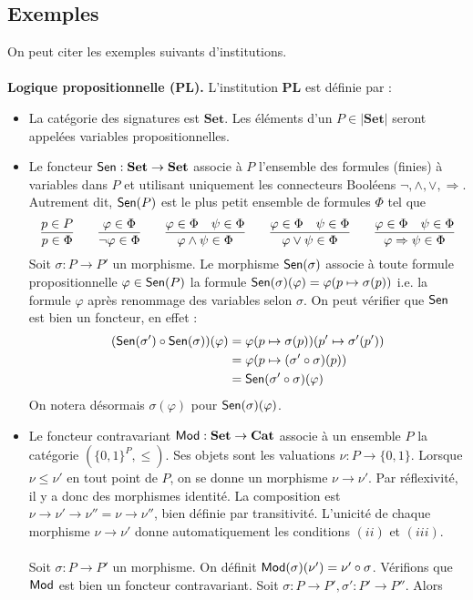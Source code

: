 \documentclass[11pt,a4paper]{article}
\newcommand{\ph}{\varphi}
\newcommand{\itemz}{\item[$\triangleright$]}
\newcommand{\gr}{\textbf}
\newcommand{\info}[1]{\text{{\fontfamily{lmss}\selectfont #1}}}
\newcommand{\Mod}{\info{Mod}}
\newcommand{\Sen}{\info{Sen}}
\begin{document}
\subsection{Exemples}
On peut citer les exemples suivants d'institutions.\\\\
\gr{Logique propositionnelle ($\gr{PL}$).} L'institution $\gr{PL}$ est définie par :
\begin{itemize}
\itemz La catégorie des signatures est $\gr{Set}$. Les éléments d'un $P \in |\gr{Set}|$ seront appelées variables propositionnelles.
\itemz Le foncteur $\Sen : \gr{Set} \to \gr{Set}$ associe à $P$ l'ensemble des formules (finies) à variables dans $P$ et utilisant uniquement les connecteurs Booléens $\neg, \wedge, \vee, \Rightarrow$. Autrement dit, $\Sen(P)$ est le plus petit ensemble de formules $\Phi$ tel que
$$
\infer{p \in \Phi}{p \in P}
\qquad
\infer{\neg \ph \in \Phi}{\ph \in \Phi}
\qquad
\infer{\ph \wedge \psi \in \Phi}{\ph \in \Phi & \psi \in \Phi }
\qquad
\infer{\ph \vee \psi \in \Phi}{\ph \in \Phi & \psi \in \Phi }
\qquad
\infer{\ph \Rightarrow \psi \in \Phi}{\ph \in \Phi & \psi \in \Phi }
$$
Soit $\sigma : P \to P'$ un morphisme. Le morphisme $\Sen(\sigma)$ associe à toute formule propositionnelle $\ph \in \Sen(P)$ la formule $\Sen(\sigma)(\ph) = \ph(p \mapsto \sigma(p))$ i.e. la formule $\ph$ après renommage des variables selon $\sigma$. On peut vérifier que $\Sen$ est bien un foncteur, en effet :
\begin{align*}
 (\Sen(\sigma') \circ \Sen(\sigma)) (\ph) & = \ph(p \mapsto \sigma(p))(p' \mapsto \sigma'(p')) \\ & = \ph(p \mapsto (\sigma' \circ \sigma)(p)) \\ & = \Sen(\sigma' \circ \sigma)(\ph) 
 \end{align*}
On notera désormais $\sigma(\ph)$ pour $\Sen(\sigma)(\ph)$.
\itemz Le foncteur contravariant $\Mod : \gr{Set} \to \gr{Cat}$ associe à un ensemble $P$ la catégorie $(\{0,1\}^P, \leq)$. Ses objets sont les valuations $\nu : P \to \{0,1\}$. Lorsque $\nu \leq \nu'$ en tout point de $P$, on se donne un morphisme $\nu \to \nu'$. Par réflexivité, il y a donc des morphismes identité. La composition est $\nu \to \nu' \to \nu'' = \nu \to \nu''$, bien définie par transitivité. L'unicité de chaque morphisme $\nu \to \nu'$ donne automatiquement les conditions $(ii)$ et $(iii)$.\\\\
Soit $\sigma : P \to P'$ un morphisme. On définit $\Mod(\sigma)(\nu') = \nu' \circ \sigma$. Vérifions que $\Mod$ est bien un foncteur contravariant. Soit $\sigma : P \to P', \sigma' : P' \to P''$. Alors

\end{itemize}
\end{document}
